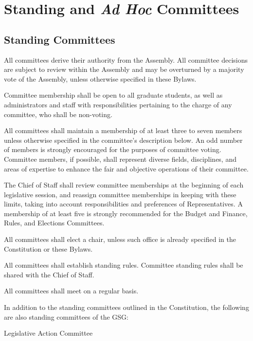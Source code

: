 \chapter{Standing and \textit{Ad Hoc} Committees}

\section{Standing Committees}
\begin{bylaws-number}
  \item All committees derive their authority from the Assembly. All committee decisions are subject to review within the Assembly and may be overturned by a majority vote of the Assembly, unless otherwise specified in these Bylaws.
  \item Committee membership shall be open to all graduate students, as well as administrators and staff with responsibilities pertaining to the charge of any committee, who shall be non-voting.
  \item All committees shall maintain a membership of at least three to seven members unless otherwise specified in the committee’s description below. An odd number of members is strongly encouraged for the purposes of committee voting. Committee members, if possible, shall represent diverse fields, disciplines, and areas of expertise to enhance the fair and objective operations of their committee.
  \item The Chief of Staff shall review committee memberships at the beginning of each legislative session, and reassign committee memberships in keeping with these limits, taking into account responsibilities and preferences of Representatives. A membership of at least five is strongly recommended for the Budget and Finance, Rules, and Elections Committees.
  \item All committees shall elect a chair, unless such office is already specified in the Constitution or these Bylaws.
  \item All committees shall establish standing rules. Committee standing rules shall be shared with the Chief of Staff.
  \item All committees shall meet on a regular basis.
  \item In addition to the standing committees outlined in the Constitution, the following are also standing committees of the GSG:
  \begin{bylaws-number}
    \item Legislative Action Committee \hfill \\

\end{bylaws-number}
\end{bylaws-number}
